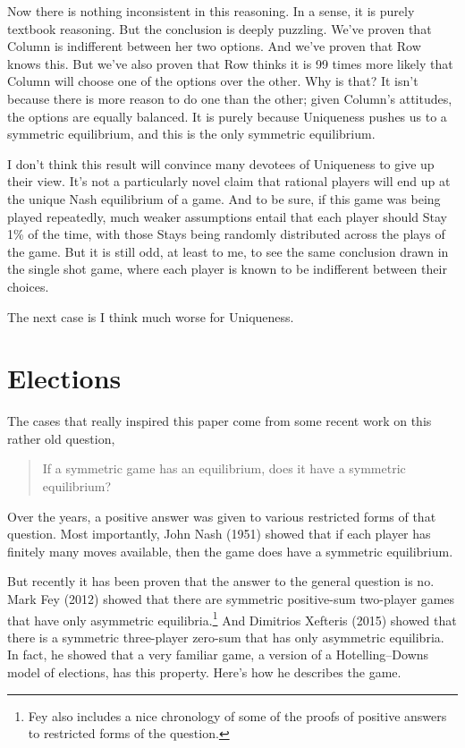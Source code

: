 \documentclass[
  11pt,
]{article}
\begin{document}
Now there is nothing inconsistent in this reasoning. In a sense, it is purely textbook reasoning. But the conclusion is deeply puzzling. We've proven that Column is indifferent between her two options. And we've proven that Row knows this. But we've also proven that Row thinks it is 99 times more likely that Column will choose one of the options over the other. Why is that? It isn't because there is more reason to do one than the other; given Column's attitudes, the options are equally balanced. It is purely because Uniqueness pushes us to a symmetric equilibrium, and this is the only symmetric equilibrium.

I don't think this result will convince many devotees of Uniqueness to give up their view. It's not a particularly novel claim that rational players will end up at the unique Nash equilibrium of a game. And to be sure, if this game was being played repeatedly, much weaker assumptions entail that each player should Stay 1\% of the time, with those Stays being randomly distributed across the plays of the game. But it is still odd, at least to me, to see the same conclusion drawn in the single shot game, where each player is known to be indifferent between their choices.

The next case is I think much worse for Uniqueness.

\hypertarget{elections}{%
\section{Elections}\label{elections}}

The cases that really inspired this paper come from some recent work on this rather old question,

\begin{quote}
If a symmetric game has an equilibrium, does it have a symmetric equilibrium?
\end{quote}

Over the years, a positive answer was given to various restricted forms of that question. Most importantly, John Nash (1951) showed that if each player has finitely many moves available, then the game does have a symmetric equilibrium.

But recently it has been proven that the answer to the general question is no. Mark Fey (2012) showed that there are symmetric positive-sum two-player games that have only asymmetric equilibria.\footnote{Fey also includes a nice chronology of some of the proofs of positive answers to restricted forms of the question.} And Dimitrios Xefteris (2015) showed that there is a symmetric three-player zero-sum that has only asymmetric equilibria. In fact, he showed that a very familiar game, a version of a Hotelling--Downs model of elections, has this property. Here's how he describes the game.
\end{document}
